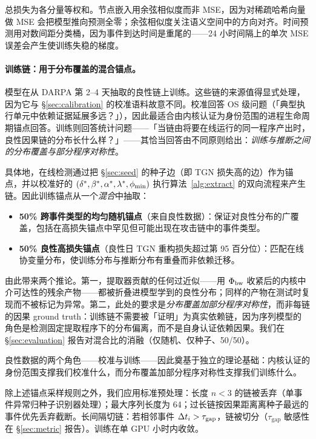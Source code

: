 总损失为各分量等权和。节点嵌入用余弦相似度而非 MSE，因为对稀疏哈希向量做 MSE 会把模型推向预测全零；余弦相似度关注语义空间中的方向对齐。时间预测用对数间距分类桶，因为事件到达时间是重尾的——24 小时间隔上的单次 MSE 误差会产生使训练失稳的梯度。

\paragraph{训练链：用于分布覆盖的混合锚点。}
\label{sec:training_chains}
模型在从 DARPA 第 2--4 天抽取的良性链上训练。这些链的来源值得显式处理，因为它与 \S\ref{sec:calibration} 的校准语料故意不同。校准回答 OS 级问题（「典型执行单元中依赖证据延展多远？」），因此最适合由内核认证为身份范围的进程生命周期锚点回答。训练则回答统计问题——「当链由将要在线运行的同一程序产出时，良性因果链的分布长什么样？」——其恰当回答由不同原则给出：\emph{训练与推断之间的分布覆盖与部分程序对称性}。

具体地，在线检测通过把 \S\ref{sec:seed} 的种子边（即 TGN 损失高的边）作为锚点，并以校准好的 $(\delta^*, \beta^*, \alpha^*, \lambda^*, \phi_{\min})$ 执行算法~\ref{alg:extract} 的双向流程来产生链。因此训练锚点从一个\emph{混合}中抽取：

\begin{itemize}
\item \textbf{50\% 跨事件类型的均匀随机锚点}（来自良性数据）：保证对良性分布的广覆盖，包括在高损失锚点中罕见但可能出现在攻击链中的事件类型。
\item \textbf{50\% 良性高损失锚点}（良性日 TGN 重构损失超过第 95 百分位）：匹配在线协变量分布，使训练分布与推断分布有重叠而非依赖迁移。
\end{itemize}

由此带来两个推论。第一，提取器贡献的任何过近似——用 $\Phi_{\text{bw}}$ 收紧后的内核中介可达性的残余产物——都被折叠进模型学到的良性分布；同样的产物在测试时复现而不被标记为异常。第二，此处的要求是\emph{分布覆盖加部分程序对称性}，而非每链的因果 ground truth：训练链不需要被「证明」为真实依赖链，因为序列模型的角色是检测固定提取程序下的分布偏离，而不是自身认证依赖因果。我们在 \S\ref{sec:evaluation} 报告对混合比的消融（仅随机、仅种子、50/50）。

良性数据的两个角色——校准与训练——因此奠基于独立的理论基础：内核认证的身份范围支撑我们校准什么，而分布覆盖加部分程序对称性支撑我们训练什么。

除上述锚点采样规则之外，我们应用标准预处理：长度 $n < 3$ 的链被丢弃（单事件异常归种子识别器处理）；最大序列长度为 64；过长链按因果距离离种子最远的事件优先丢弃截断。长间隔切链：若相邻事件 $\Delta t_i > \tau_{\text{gap}}$，链被切分（$\tau_{\text{gap}}$ 敏感性在 \S\ref{sec:metric} 报告）。训练在单 GPU 小时内收敛。

